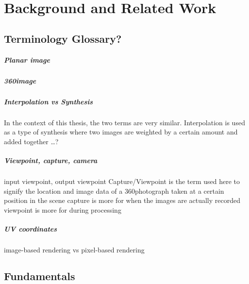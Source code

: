 \chapter{Background and Related Work}

\section{Terminology \ar Glossary?}

\paragraph{Planar image}
\paragraph{360\degree image}
\paragraph{Interpolation vs Synthesis} In the context of this thesis, the two terms are very similar. Interpolation is used as a type of synthesis where two images are weighted by a certain amount and added together \ldots ?
\paragraph{Viewpoint, capture, camera} input viewpoint, output viewpoint
Capture/Viewpoint is the term used here to signify the location and image data of a 360\degree photograph taken at a certain position in the scene
capture is more for when the images are actually recorded
viewpoint is more for during processing
\paragraph{UV coordinates}
image-based rendering vs pixel-based rendering

\section{Fundamentals}

